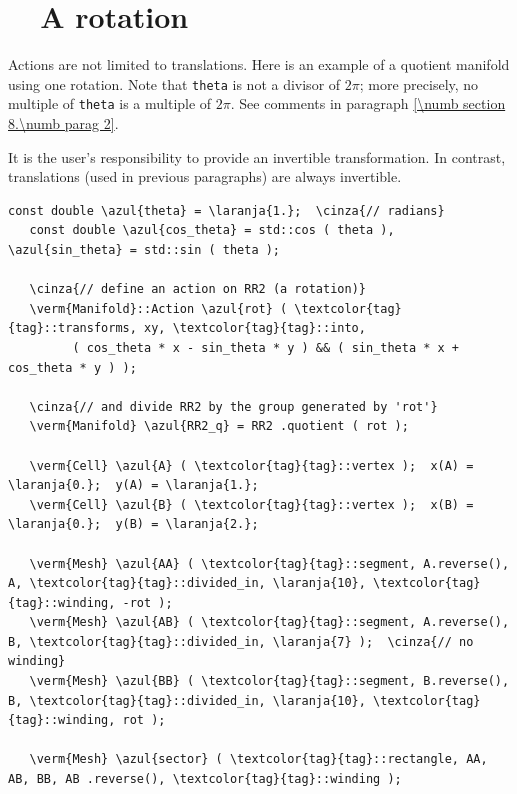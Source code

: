 \section{~~A rotation}\label{\numb section 7.\numb parag 14}

Actions are not limited to translations.
Here is an example of a quotient manifold using one rotation.
Note that {\small\tt theta} is not a divisor of $ 2\pi $;
more precisely, no multiple of {\small\tt theta} is a multiple of $ 2\pi $.
See comments in paragraph \ref{\numb section 8.\numb parag 2}.

It is the user's responsibility to provide an invertible transformation.
In contrast, translations (used in previous paragraphs) are always invertible.

\begin{Verbatim}[commandchars=\\\{\},formatcom=\small\tt,frame=single,
   label=parag-\ref{\numb section 7.\numb parag 14}.cpp,rulecolor=\color{moldura},
   baselinestretch=0.94,framesep=2mm                                             ]
   const double \azul{theta} = \laranja{1.};  \cinza{// radians}
   const double \azul{cos_theta} = std::cos ( theta ), \azul{sin_theta} = std::sin ( theta );

   \cinza{// define an action on RR2 (a rotation)}
   \verm{Manifold}::Action \azul{rot} ( \textcolor{tag}{tag}::transforms, xy, \textcolor{tag}{tag}::into,
         ( cos_theta * x - sin_theta * y ) && ( sin_theta * x + cos_theta * y ) );

   \cinza{// and divide RR2 by the group generated by 'rot'}
   \verm{Manifold} \azul{RR2_q} = RR2 .quotient ( rot );

   \verm{Cell} \azul{A} ( \textcolor{tag}{tag}::vertex );  x(A) = \laranja{0.};  y(A) = \laranja{1.};
   \verm{Cell} \azul{B} ( \textcolor{tag}{tag}::vertex );  x(B) = \laranja{0.};  y(B) = \laranja{2.};

   \verm{Mesh} \azul{AA} ( \textcolor{tag}{tag}::segment, A.reverse(), A, \textcolor{tag}{tag}::divided_in, \laranja{10}, \textcolor{tag}{tag}::winding, -rot );
   \verm{Mesh} \azul{AB} ( \textcolor{tag}{tag}::segment, A.reverse(), B, \textcolor{tag}{tag}::divided_in, \laranja{7} );  \cinza{// no winding}
   \verm{Mesh} \azul{BB} ( \textcolor{tag}{tag}::segment, B.reverse(), B, \textcolor{tag}{tag}::divided_in, \laranja{10}, \textcolor{tag}{tag}::winding, rot );

   \verm{Mesh} \azul{sector} ( \textcolor{tag}{tag}::rectangle, AA, AB, BB, AB .reverse(), \textcolor{tag}{tag}::winding );
\end{Verbatim}

